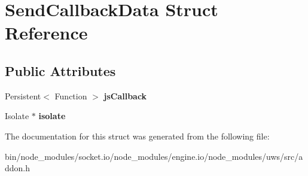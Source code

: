 \hypertarget{struct_send_callback_data}{}\section{Send\+Callback\+Data Struct Reference}
\label{struct_send_callback_data}
\subsection*{Public Attributes}
\begin{DoxyCompactItemize}
\item 
\mbox{\label{struct_send_callback_data_abbdc6534cf0f2a939246bdd6c9a833c9}} 
Persistent$<$ Function $>$ {\bfseries js\+Callback}
\item 
\mbox{\label{struct_send_callback_data_ab1b3d6aba933b5dbbc185361df4368ad}} 
Isolate $\ast$ {\bfseries isolate}
\end{DoxyCompactItemize}


The documentation for this struct was generated from the following file\+:\begin{DoxyCompactItemize}
\item 
bin/node\+\_\+modules/socket.\+io/node\+\_\+modules/engine.\+io/node\+\_\+modules/uws/src/addon.\+h\end{DoxyCompactItemize}
